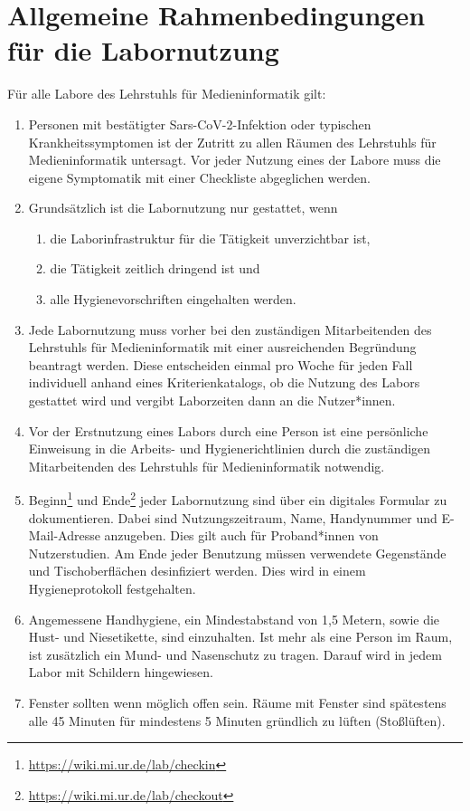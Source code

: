 \section{Allgemeine Rahmenbedingungen für die Labornutzung}\label{sec:allgemein}

\noindent
Für alle Labore des Lehrstuhls für Medieninformatik gilt:

\begin{enumerate}
    \item{Personen mit bestätigter Sars-CoV-2-Infektion oder typischen Krankheitssymptomen ist der Zutritt zu allen Räumen des Lehrstuhls für Medieninformatik untersagt. Vor jeder Nutzung eines der Labore muss die eigene Symptomatik mit einer Checkliste abgeglichen werden.}
    \item Grundsätzlich ist die Labornutzung nur gestattet, wenn
    \begin{enumerate}
        \item die Laborinfrastruktur für die Tätigkeit unverzichtbar ist,
        \item die Tätigkeit zeitlich dringend ist und 
        \item alle Hygienevorschriften eingehalten werden.
    \end{enumerate}
    \item{Jede Labornutzung muss vorher bei den zuständigen Mitarbeitenden des Lehrstuhls für Medieninformatik mit einer ausreichenden Begründung beantragt werden. Diese entscheiden einmal pro Woche für jeden Fall individuell anhand eines Kriterienkatalogs, ob die Nutzung des Labors gestattet wird und vergibt Laborzeiten dann an die Nutzer*innen.}
    \item{Vor der Erstnutzung eines Labors durch eine Person ist eine persönliche Einweisung in die Arbeits- und Hygienerichtlinien durch die zuständigen Mitarbeitenden des Lehrstuhls für Medieninformatik notwendig.}
    \item{Beginn\footnote{\url{https://wiki.mi.ur.de/lab/checkin}} und Ende\footnote{\url{https://wiki.mi.ur.de/lab/checkout}} jeder Labornutzung sind über ein digitales Formular zu dokumentieren.
    Dabei sind Nutzungszeitraum, Name, Handynummer und E-Mail-Adresse anzugeben.
    Dies gilt auch für Proband*innen von Nutzerstudien.
    Am Ende jeder Benutzung müssen verwendete Gegenstände und Tischoberflächen desinfiziert werden.
    Dies wird in einem Hygieneprotokoll festgehalten.}
    \item{Angemessene Handhygiene, ein Mindestabstand von 1,5 Metern, sowie die Hust- und Niesetikette, sind einzuhalten.
    Ist mehr als eine Person im Raum, ist zusätzlich ein Mund- und Nasenschutz zu tragen.
    Darauf wird in jedem Labor mit Schildern hingewiesen.}
    \item{Fenster sollten wenn möglich offen sein. Räume mit Fenster sind spätestens alle 45 Minuten für mindestens 5 Minuten gründlich zu lüften (Stoßlüften).}
\end{enumerate}
